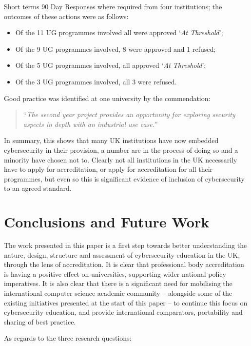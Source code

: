 \documentclass[conference]{IEEEtran}
\begin{document}
Short terms 90 Day Responses where required from four institutions; the outcomes of these actions were as follows:

\begin{itemize}                                                                
\item Of the 11 UG programmes involved all were approved `{\emph{At Threshold}}';
\item Of the 9 UG programmes involved, 8 were approved and 1 refused;
\item Of the 5 UG programmes involved, all approved `{\emph{At Threshold}}';
\item Of the 3 UG programmes involved, all 3 were refused.
\end{itemize}
 
Good practice was identified at one university by the commendation:
 \begin{quote}
``{\emph{The second year project provides an opportunity for exploring security aspects in depth with an industrial use case.}}''
\end{quote}

In summary, this shows that many UK institutions have now embedded cybersecurity in their provision, a number are in the process of doing so and a minority have chosen not to. Clearly not all institutions in the UK necessarily have to apply for accreditation, or apply for accreditation for all their programmes, but even so this is significant evidence of inclusion of cybersecurity to an agreed standard.

\section{Conclusions and Future Work}

The work presented in this paper is a first step towards better understanding the nature, design, structure and assessment of cybersecurity education in the UK, through the lens of accreditation. It is clear that professional body accreditation is having a positive effect on universities, supporting wider national policy imperatives. It is also clear that there is a significant need for mobilising the international computer science academic community -- alongside some of the existing initiatives presented at the start of this paper -- to continue this focus on cybersecurity education, and provide international comparators, portability and sharing of best practice. 

As regards to the three research questions:
\end{document}
